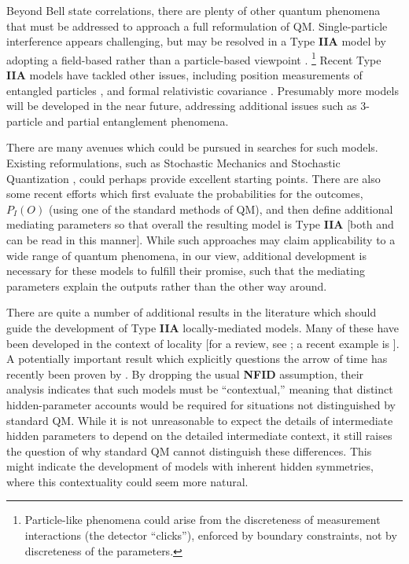 \documentclass[rmp, aps, preprint, longbibliography]{revtex4-1}
\begin{document}
Beyond Bell state correlations, there are plenty of other quantum phenomena that must be addressed to approach a full reformulation of QM\@.  Single-particle interference appears challenging, but may be resolved in a Type {\bf IIA} model by adopting a field-based rather than a particle-based viewpoint \cite{wharton2018}.%
\footnote{Particle-like phenomena could arise from the discreteness of measurement interactions (the detector ``clicks''), enforced by boundary constraints, not by discreteness of the parameters.}
Recent Type {\bf IIA} models have tackled other issues, including position measurements of entangled particles \cite{sen2018}, and formal relativistic covariance \cite{wharton2010b,heaney2013,sutherland2017}.  Presumably more models will be developed in the near future, addressing additional issues such as 3-particle and partial entanglement phenomena.

There are many avenues which could be pursued in searches for such models.  Existing reformulations, such as Stochastic Mechanics \cite{nelson1966,nelson2012} and Stochastic Quantization \cite{damgaard1987}, could perhaps provide excellent starting points.  There are also some recent efforts which first evaluate the probabilities for the outcomes, $P_I(O)$ (using one of the standard methods of QM), and then define additional mediating parameters so that overall the resulting model is Type {\bf IIA} [both \textcite{sutherland2017} and \textcite{drummond2019} can be read in this manner].  While such approaches may claim applicability to a wide range of quantum phenomena, in our view, additional development is necessary for these models to fulfill their promise, such that the mediating parameters explain the outputs rather than the other way around.

There are quite a number of additional results in the literature which should guide the development of Type {\bf IIA} locally-mediated models.  Many of these have been developed in the context of locality [for a review, see \textcite{brunner2014}; a recent example is \textcite{carmi2018}].  A potentially important result which explicitly questions the arrow of time has recently been proven by \textcite{shrapnel2017}.  By dropping the usual {\bf NFID} assumption, their analysis indicates that such models must be ``contextual,'' meaning that distinct hidden-parameter accounts would be required for situations not distinguished by standard QM.  While it is not unreasonable to expect the details of intermediate hidden parameters to depend on the detailed intermediate context, it still raises the question of why standard QM cannot distinguish these differences.  This might indicate the development of models with inherent hidden symmetries, where this contextuality could seem more natural.
\end{document}
